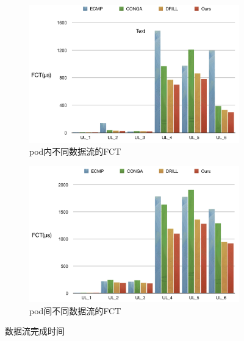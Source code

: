 \begin{figure}[htb!]
\centering
\begin{subfigure}{0.47\textwidth}
     \includegraphics[width=\textwidth]{figure/intrpod.png}
     \caption{pod内不同数据流的FCT}
\end{subfigure}\hspace{2em}
\begin{subfigure}{0.47\textwidth}
    \includegraphics[width=\textwidth]{figure/intepod.png}
    \caption{pod间不同数据流的FCT}

\end{subfigure}%
\caption{数据流完成时间}
\label{fig:podfct}
\end{figure}


